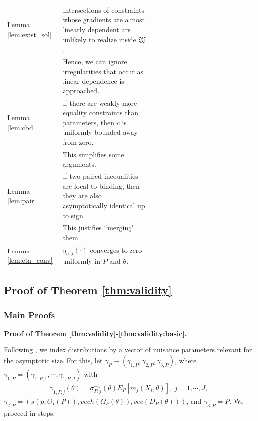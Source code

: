 \documentclass[letterpaper,11pt]{article}
\theoremstyle{myplain}
\theoremstyle{mydefinition}
\theoremstyle{myremark}
\renewcommand{\cite}{\citet}
\numberwithin{equation}{section}
\numberwithin{figure}{section}
\begin{document}
\begin{appendices}
\begin{table}[!htbp]
{\begin{tabular}{lllllllllllllllll}
Lemma \ref{lem:exist_sol} & Intersections of constraints whose gradients are almost linearly dependent are unlikely to realize inside $\mathfrak{W}$. \\
 & Hence, we can ignore irregularities that occur as linear dependence is approached.\\
[0.15cm]
Lemma \ref{lem:cbd} & If there are weakly more equality constraints than parameters, then $c$ is uniformly bounded away from zero.\\
 & This simplifies some arguments.\\
[0.15cm]
Lemma \ref{lem:pair} & If two paired inequalities are local to binding, then they are also asymptotically identical up to sign.\\
 & This justifies ``merging" them.\\
[0.15cm]


Lemma \ref{lem:eta_conv} & $\eta_{n,j}(\cdot)$ converges to zero uniformly in $P$ and $\theta$.\\
[0.15cm]
\hline \hline
\end{tabular}
}
\end{table}

\pagebreak

\clearpage
\subsection{Proof of Theorem \ref{thm:validity}}\label{sec:proofs:thms}

\subsubsection{Main Proofs}
\textbf{Proof of Theorem \ref{thm:validity}-\ref{thm:validity:basic}.}

Following \cite{Andrews_Guggenberger2009bET}, we index distributions by a vector of nuisance parameters relevant for the asymptotic size. For this, let $\gamma_P\equiv(\gamma_{1,P},\gamma_{2,P},\gamma_{3,P})$, where
 $\gamma_{1,P}=(\gamma_{1,P,1},\cdots,\gamma_{1,P,J})$ with 
\begin{align}
\gamma_{1,P,j}(\theta)=\sigma_{P,j}^{-1}(\theta)E_P[m_j(X_i,\theta)],
~j=1,\cdots, J,\label{eq:cover1}
\end{align}
$\gamma_{2,P}=(s(p,\Theta_I(P)),vech(\Omega_P(\theta)),vec(D_P(\theta)))$, and
$\gamma_{3,P}=P$. We proceed in steps.


\end{appendices}
\end{document}
